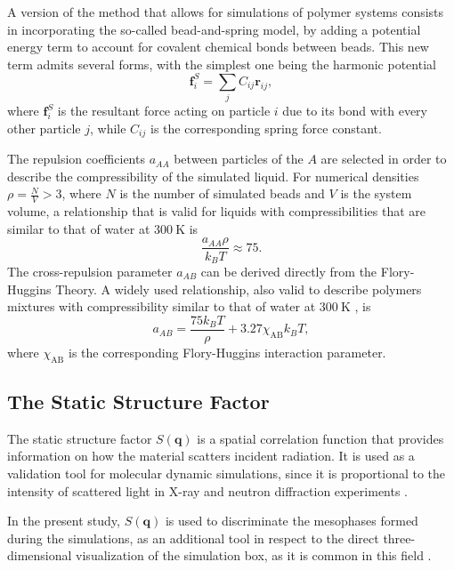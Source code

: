 \documentclass[
aip,
jcp,
reprint,
]{revtex4-1}
\newcommand{\vt}[1]{\boldsymbol{\mathbf{#1}}}          %
\begin{document}
A version of the method that allows for simulations of polymer systems consists in incorporating the so-called bead-and-spring model, by adding a potential energy term to account for covalent chemical bonds between beads.
This new term admits several forms, with the simplest one being the harmonic potential
\begin{equation}
{\vt f}_i^S = \sum_j C_{ij} {\vt r}_{ij},
\end{equation}
where ${\vt f}_i^S$ is the resultant force acting on particle $i$ due to its bond with every other particle $j$, while $C_{ij}$ is the corresponding spring force constant.

The repulsion coefficients $a_{AA}$ between particles of the $A$ are selected in order to describe the compressibility of the simulated liquid.
For numerical densities $\rho = \frac{N}{V} > 3$, where $N$ is the number of simulated beads and $V$ is the system volume, a relationship that is valid for liquids with compressibilities that are similar to that of water at $300~\mathrm{K}$ is \cite{Groot_1997}
\begin{equation}
\label{eq:like-particle repulsive parameter}
\frac{a_{AA} \rho}{k_B T} \approx 75.
\end{equation}
The cross-repulsion parameter $a_{AB}$ can be derived directly from the Flory-Huggins Theory.
A widely used relationship, also valid to describe polymers mixtures with compressibility similar to that of water at $300~\mathrm{K}$ \cite{Groot_1998, Martinez-Veracoechea_2006, Martinez-Veracoechea_2009, Gavrilov_2013}, is
\begin{equation}
\label{eq:unlike-particle repulsive parameter}
a_{AB} = \frac{75 k_B T}{\rho} + 3.27 \chi_\mathrm{AB} k_B T,
\end{equation}
where $\chi_\mathrm{AB}$ is the corresponding Flory-Huggins interaction parameter.

\subsection{The Static Structure Factor}

The static structure factor $S(\vt q)$ is a spatial correlation function that provides information on how the material scatters incident radiation.
It is used as a validation tool for molecular dynamic simulations, since it is proportional to the intensity of scattered light in X-ray and neutron diffraction experiments \cite{Hansen_2013}.

In the present study, $S(\vt q)$ is used to discriminate the mesophases formed during the simulations, as an additional tool in respect to the direct three-dimensional visualization of the simulation box, as it is common in this field \cite{Martinez-Veracoechea_2005, Gavrilov_2013, Lemos_2020}.
\end{document}

